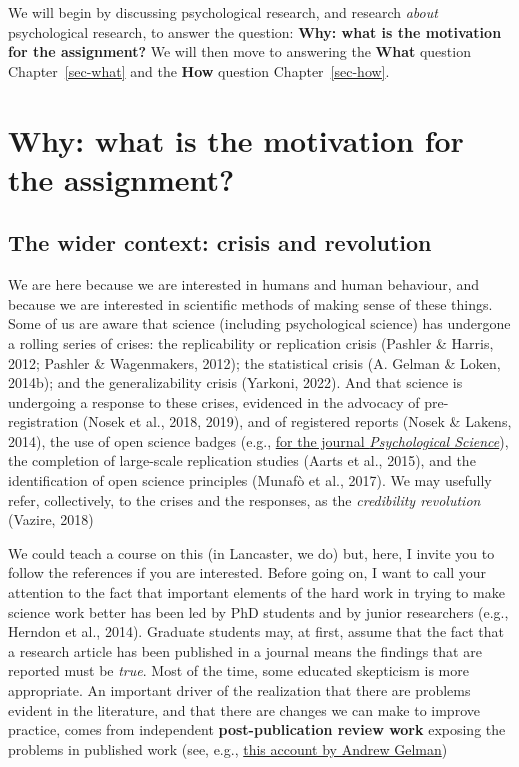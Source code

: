 \documentclass[
  letterpaper,
  DIV=11,
  numbers=noendperiod]{scrreprt}
\begin{document}
We will begin by discussing psychological research, and research
\emph{about} psychological research, to answer the question:
\textbf{Why: what is the motivation for the assignment?} We will then
move to answering the \textbf{What} question Chapter~\ref{sec-what} and
the \textbf{How} question Chapter~\ref{sec-how}.

\hypertarget{sec-motivation-for-assignment}{%
\section{Why: what is the motivation for the
assignment?}\label{sec-motivation-for-assignment}}

\hypertarget{sec-wider-context-crises}{%
\subsection{The wider context: crisis and
revolution}\label{sec-wider-context-crises}}

We are here because we are interested in humans and human behaviour, and
because we are interested in scientific methods of making sense of these
things. Some of us are aware that science (including psychological
science) has undergone a rolling series of crises: the replicability or
replication crisis (Pashler \& Harris, 2012; Pashler \& Wagenmakers,
2012); the statistical crisis (A. Gelman \& Loken, 2014b); and the
generalizability crisis (Yarkoni, 2022). And that science is undergoing
a response to these crises, evidenced in the advocacy of
pre-registration (Nosek et al., 2018, 2019), and of registered reports
(Nosek \& Lakens, 2014), the use of open science badges (e.g.,
\href{https://www.psychologicalscience.org/publications/badges}{for the
journal \emph{Psychological Science}}), the completion of large-scale
replication studies (Aarts et al., 2015), and the identification of open
science principles (Munafò et al., 2017). We may usefully refer,
collectively, to the crises and the responses, as the \emph{credibility
revolution} (Vazire, 2018)

We could teach a course on this (in Lancaster, we do) but, here, I
invite you to follow the references if you are interested. Before going
on, I want to call your attention to the fact that important elements of
the hard work in trying to make science work better has been led by PhD
students and by junior researchers (e.g., Herndon et al., 2014).
Graduate students may, at first, assume that the fact that a research
article has been published in a journal means the findings that are
reported must be \emph{true}. Most of the time, some educated skepticism
is more appropriate. An important driver of the realization that there
are problems evident in the literature, and that there are changes we
can make to improve practice, comes from independent
\textbf{post-publication review work} exposing the problems in published
work (see, e.g.,
\href{https://statmodeling.stat.columbia.edu/2016/12/16/an-efficiency-argument-for-post-publication-review/}{this
account by Andrew Gelman})
\end{document}
